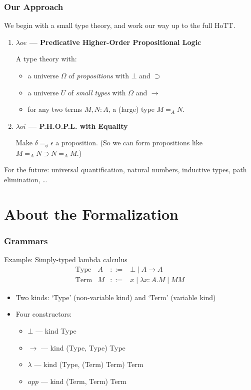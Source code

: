 \documentclass[handout]{beamer}
\begin{document}
\begin{frame}
\frametitle{Our Approach}
We begin with a small type theory, and work our way up to the full HoTT. %
\begin{enumerate}
\item \textbf{$\lambda o e$ --- Predicative Higher-Order Propositional Logic}

 A type theory with:
  \begin{itemize}
  \item a universe $\Omega$ of \emph{propositions} with $\bot$ and $\supset$
  \item a universe $U$ of \emph{small types} with $\Omega$ and $\rightarrow$
  \item for any two terms $M, N : A$, a (large) type $M =_A N$.
  \end{itemize}
\item \textbf{$\lambda o i$ --- P.H.O.P.L. with Equality}

Make $\delta =_\phi \epsilon$ a proposition.  (So we can form propositions like $M =_A N \supset N =_A M$.)
\end{enumerate}
For the future: universal quantification, natural numbers, inductive types, path elimination, \ldots
\end{frame}

\section{About the Formalization}

\begin{frame}[fragile]
\frametitle{Grammars}
Example: Simply-typed lambda calculus
\[ \begin{array}{lrcl}
\text{Type} & A & ::= & \bot \mid A \rightarrow A \\
\text{Term} & M & ::= & x \mid \lambda x:A.M \mid M M
\end{array} \]

\begin{itemize}
\item
Two kinds: `Type' (non-variable kind) and `Term' (variable kind)
\item
Four constructors:
\begin{itemize}
\item
$\bot$ --- kind Type
\item
$\rightarrow$ --- kind (Type, Type) Type
\item
$\lambda$ --- kind (Type, (Term) Term) Term
\item
$app$ --- kind (Term, Term) Term
\end{itemize}
\end{itemize}
\end{frame}
\end{document}
